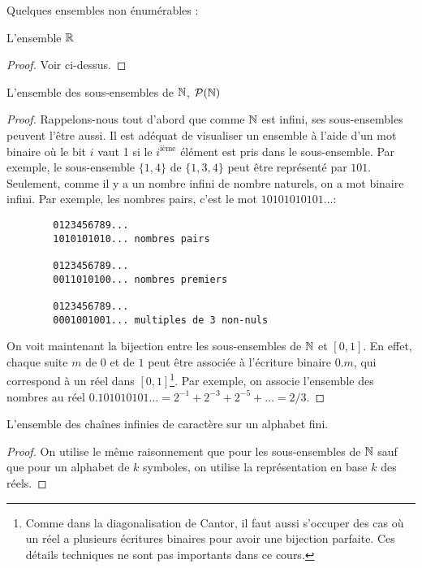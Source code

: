 Quelques ensembles non énumérables :
\begin{myexem}
 L'ensemble $\mathbb{R}$
 \begin{proof}
   Voir ci-dessus.
 \end{proof}
\end{myexem}

\begin{myexem}
 L'ensemble des sous-ensembles de $\mathbb{N}$, $\mathcal{P}(\mathbb{N})$
 \begin{proof}
   Rappelons-nous tout d'abord que comme $\mathbb{N}$ est infini, ses sous-ensembles peuvent l'être aussi.
   Il est adéquat de visualiser un ensemble à l'aide d'un mot binaire
   où le bit $i$ vaut 1 si le $i^{\mathrm{ième}}$ élément est pris dans le sous-ensemble.
   Par exemple, le sous-ensemble $\{1,4\}$ de $\{1,3,4\}$ peut être représenté par $101$.
   Seulement, comme il y a un nombre infini de nombre naturels, on a mot binaire infini.
   Par exemple, les nombres pairs, c'est le mot $10101010101\ldots$:
   \begin{verbatim}
		0123456789...
		1010101010... nombres pairs

		0123456789...
		0011010100... nombres premiers

		0123456789...
		0001001001... multiples de 3 non-nuls
    \end{verbatim}
   On voit maintenant la bijection entre les sous-ensembles de $\mathbb{N}$ et $[0,1]$.
   En effet, chaque suite $m$ de $0$ et de $1$ peut être associée à l'écriture binaire $0.m$, qui correspond à un réel dans $[0,1]$\footnote{Comme dans la diagonalisation de Cantor, il faut aussi s'occuper des cas où un réel a plusieurs écritures binaires pour avoir une bijection parfaite. Ces détails techniques ne sont pas importants dans ce cours.}. Par exemple, on associe l'ensemble des nombres au réel $0.101010101\ldots = 2^{-1}+2^{-3}+2^{-5}+\ldots = 2/3$.
 \end{proof}
\end{myexem}

\begin{myexem}
 L'ensemble des chaînes infinies de caractère sur un alphabet fini.
 \begin{proof}
   On utilise le même raisonnement que pour les sous-ensembles de $\mathbb{N}$ sauf que pour un alphabet de $k$ symboles,
   on utilise la représentation en base $k$ des réels.
 \end{proof}
\end{myexem}

